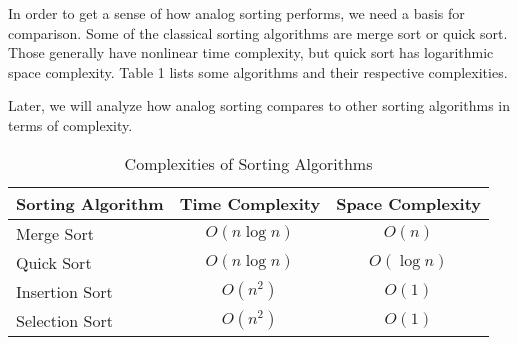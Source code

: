 In order to get a sense of how analog sorting performs, we need a basis for comparison. Some of the classical sorting algorithms are merge sort or quick sort. Those generally have nonlinear time complexity, but quick sort has logarithmic space complexity. Table 1 lists some algorithms and their respective complexities.

Later, we will analyze how analog sorting compares to other sorting algorithms in terms of complexity. 
\begin{table}[h]
\centering
\caption{Complexities of Sorting Algorithms}
\begin{tabular}{|l|c|c|} \hline
Sorting Algorithm&Time Complexity&Space Complexity\\ \hline
Merge Sort & $O(n\log n)$& $O(n)$\\ \hline
Quick Sort & $O(n\log n)$& $O(\log n)$\\ \hline
Insertion Sort & $O(n^2)$& $O(1)$\\ \hline
Selection Sort & $O(n^2)$& $O(1)$\\
\hline\end{tabular}
\end{table}


